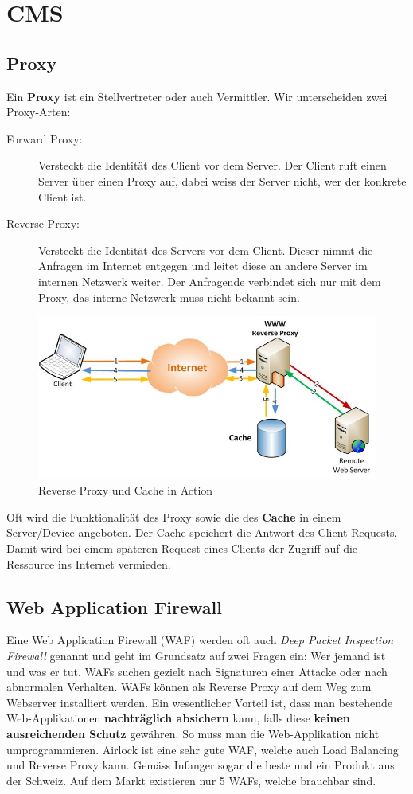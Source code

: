 \chapter{CMS}


\section{Proxy}
Ein \textbf{Proxy} ist ein Stellvertreter oder auch Vermittler. Wir unterscheiden zwei Proxy-Arten:

\begin{description}
	\item[Forward Proxy:] Versteckt die Identität des Client vor dem Server. Der Client ruft einen Server über einen Proxy auf, dabei weiss der Server nicht, wer der konkrete Client ist.
	\item[Reverse Proxy:] Versteckt die Identität des Servers vor dem Client.  Dieser nimmt die Anfragen im Internet entgegen und leitet diese an andere Server im internen Netzwerk weiter. Der Anfragende verbindet sich nur mit dem Proxy, das interne Netzwerk muss nicht bekannt sein.
\end{description}

\begin{figure}[h!]
	\centering
	\includegraphics[width=0.7\linewidth]{fig/cms-reverse-proxy-cache}
	\caption{Reverse Proxy und Cache in Action}
	\label{fig:cms-reverse-proxy-cache}
\end{figure}

Oft wird die Funktionalität des Proxy sowie die des \textbf{Cache} in einem Server/Device angeboten. Der Cache speichert die Antwort des Client-Requests. Damit wird bei einem späteren Request eines Clients der Zugriff auf die Ressource ins Internet vermieden.

\section{Web Application Firewall}
Eine Web Application Firewall (WAF) werden oft auch \emph{Deep Packet Inspection Firewall} genannt und geht im Grundsatz auf zwei Fragen ein: Wer jemand ist und was er tut. WAFs suchen gezielt nach Signaturen einer Attacke oder nach abnormalen Verhalten. WAFs können als Reverse Proxy auf dem Weg zum Webserver installiert werden. Ein wesentlicher Vorteil ist, dass man bestehende Web-Applikationen \textbf{nachträglich absichern} kann, falls diese \textbf{keinen ausreichenden Schutz} gewähren. So muss man die Web-Applikation nicht umprogrammieren. Airlock ist eine sehr gute WAF, welche auch Load Balancing und Reverse Proxy kann. Gemäss Infanger sogar die beste und ein Produkt aus der Schweiz. Auf dem Markt existieren nur 5 WAFs, welche brauchbar sind.

